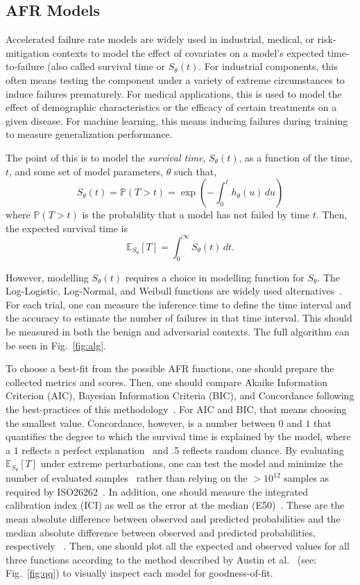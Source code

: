 \documentclass[journal]{IEEEtran}
\begin{document}
\subsection{AFR Models}
\label{survival_time}
Accelerated failure rate models are widely used in industrial, medical, or risk-mitigation contexts \cite{kleinbaum1996survival, aft_models} to model the effect of covariates on a model's expected time-to-failure (also called survival time or $S_{\theta}(t)$. For industrial components, this often means testing the component under a variety  of extreme circumstances to induce failures prematurely. For medical applications, this is used to model the effect of demographic characteristics or the efficacy of certain treatments on a given disease. For machine learning, this means inducing failures during training to measure generalization performance.

The point of this is to model the \textit{survival time}, $S_{\theta}(t)$, as a function of the time, $t$,  and some set of model parameters, $\theta$ such that,
$$
S_{\theta}(t)= \mathbb{P}(T>t) = \exp\left(-\int_0^t h_{\theta}(u) \, du\right)
$$
where $\mathbb{P}(T>t)$ is the probability that a model has not failed by time $t$. Then, the expected survival time is
\[
	\mathbb{E}_{S_\theta}[T] = \int_0^{\infty}  S_\theta(t) \,dt.
\]

However, modelling $S_{\theta}(t)$ requires a choice in modelling function for $S_{\theta}$. The Log-Logistic, Log-Normal, and Weibull functions are widely used alternatives~\cite{kleinbaum1996survival}. For each trial, one can measure the inference time to define the time interval and the accuracy to estimate the number of failures in that time interval. This should be measured in both the benign and adversarial contexts. The full algorithm can be seen in Fig.~\ref{fig:alg}.

To choose a best-fit from the possible AFR functions, one should prepare the collected metrics and scores. Then, one should compare Akaike Information Criterion (AIC), Bayesian Information Criteria (BIC), and Concordance following the best-practices of this methodology~\cite{aft_models,kleinbaum1996survival}. For AIC and BIC, that means choosing the smallest value. Concordance, however, is a number between $0$ and $1$ that quantifies the degree to which the survival time is explained by the model, where a $1$ reflects a perfect explanation~\cite{kleinbaum1996survival} and .5 reflects random chance. By evaluating $\mathbb{E}_{S_\theta}[T]$ under extreme perturbations, one can test the model and minimize the number of evaluated samples~\cite{aft_models,kleinbaum1996survival} rather than relying on the $> 10^{12}$ samples as required by ISO26262~\cite{iso26262}. In addition, one should measure the integrated calibration index (ICI) as well as the error at the median (E50)~\cite{ici}. These are the mean absolute difference between observed and predicted probabilities and the median absolute difference between observed and predicted probabilities, respectively ~\cite{ici}. Then, one should plot all the expected and observed values for all three functions according to the method described by Austin et al.~\cite{ici} (see: Fig.~\ref{fig:qq}) to visually inspect each model for goodness-of-fit.
\end{document}
